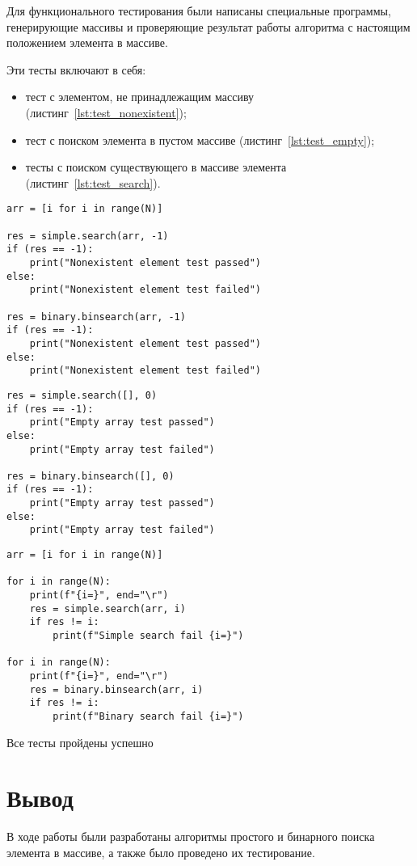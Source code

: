 Для функционального тестирования были написаны специальные программы, генерирующие массивы и проверяющие результат работы алгоритма с настоящим положением элемента в массиве.

Эти тесты включают в себя:
\begin{itemize}
  \item тест с элементом, не принадлежащим массиву (листинг~\ref{lst:test_nonexistent});
  \item тест с поиском элемента в пустом массиве (листинг~\ref{lst:test_empty});
  \item тесты с поиском существующего в массиве элемента (листинг~\ref{lst:test_search}).
\end{itemize}

\begin{lstlisting}[label=lst:test_nonexistent,caption={Тест поиска несуществующего элемента в массиве}]
arr = [i for i in range(N)]

res = simple.search(arr, -1)
if (res == -1):
    print("Nonexistent element test passed")
else:
    print("Nonexistent element test failed")

res = binary.binsearch(arr, -1)
if (res == -1):
    print("Nonexistent element test passed")
else:
    print("Nonexistent element test failed")
\end{lstlisting}

\begin{lstlisting}[label=lst:test_empty,caption={Тест поиска элемента в пустом массиве}]
res = simple.search([], 0)
if (res == -1):
    print("Empty array test passed")
else:
    print("Empty array test failed")

res = binary.binsearch([], 0)
if (res == -1):
    print("Empty array test passed")
else:
    print("Empty array test failed")
\end{lstlisting}

\begin{lstlisting}[label=lst:test_search,caption={Тест поиска элементов в массиве}]
arr = [i for i in range(N)]

for i in range(N):
    print(f"{i=}", end="\r")
    res = simple.search(arr, i)
    if res != i:
        print(f"Simple search fail {i=}")

for i in range(N):
    print(f"{i=}", end="\r")
    res = binary.binsearch(arr, i)
    if res != i:
        print(f"Binary search fail {i=}")
\end{lstlisting}

Все тесты пройдены успешно

\section*{Вывод}

В ходе работы были разработаны алгоритмы простого и бинарного поиска элемента в массиве, а также было проведено их тестирование.

\clearpage